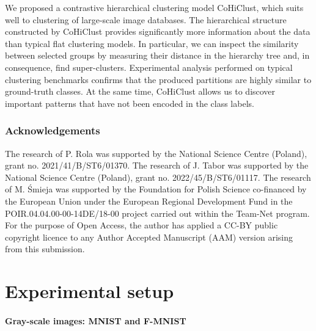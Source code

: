 \documentclass[runningheads]{llncs}
\def\our{CoHiClust}
\begin{document}
We proposed a contrastive hierarchical clustering model \our{}, which suits well to clustering of large-scale image databases. The hierarchical structure constructed by \our{} provides significantly more information about the data than typical flat clustering models. In particular, we can inspect the similarity between selected groups by measuring their distance in the hierarchy tree and, in consequence, find super-clusters. Experimental analysis performed on typical clustering benchmarks confirms that the produced partitions are highly similar to ground-truth classes. At the same time, \our{} allows us to discover important patterns that have not been encoded in the class labels. 

















\subsubsection{Acknowledgements} The research of P. Rola was supported by the National Science Centre (Poland), grant no. 2021/41/B/ST6/01370. The research of J. Tabor was supported by the National Science Centre (Poland), grant no. 2022/45/B/ST6/01117. The research of M. Śmieja was supported by the Foundation for Polish Science co-financed by the European Union under the European Regional Development Fund in the POIR.04.04.00-00-14DE/18-00 project carried out within the Team-Net program. For the purpose of Open Access, the author has applied a CC-BY public copyright licence to any Author Accepted Manuscript (AAM) version arising from this submission.








\appendix


\section{Experimental setup}

\paragraph{Gray-scale images: MNIST and F-MNIST}
\end{document}
